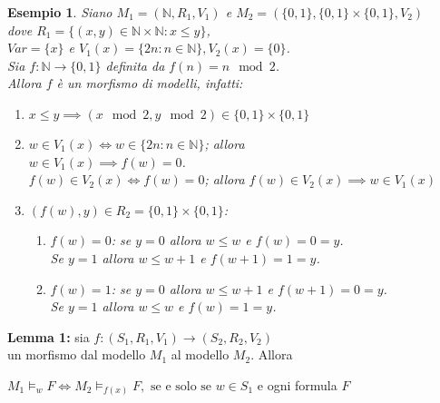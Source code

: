 \documentclass[a4paper,12pt]{article}
\theoremstyle{def}
\theoremstyle{prop}
\theoremstyle{esempio}
\newtheorem*{example}{Esempio}
\theoremstyle{dimostrazione}
\theoremstyle{teo}
\theoremstyle{osservazione}
\begin{document}
\begin{example}
	Siano \(M_1 = (\mathbb{N}, R_1, V_1)\) e \(M_2 = (\{0,1\}, \{0,1\} \times \{0,1\}, V_2)\)\\
	dove \(R_1 = \{(x,y) \in \mathbb{N} \times \mathbb{N} : x \leq y\}\),\\
	\(Var = \{x\}\) e \(V_1(x)= \{2n : n \in \mathbb{N}\}, V_2(x) = \{0\}\).\\
	Sia \(f: \mathbb{N} \rightarrow \{0,1\}\) definita da \(f(n) = n \mod 2\).\\
	Allora \(f\) è un morfismo di modelli, infatti:
	\begin{enumerate}
		\item \(x \leq y \implies (x \mod 2, y \mod 2) \in \{0,1\} \times \{0,1\}\)
		\item \(w \in V_1(x) \iff w \in \{2n: n \in \mathbb{N}\}\); allora\\
		      \(w \in V_1(x) \implies f(w) = 0\).\\
		      \(f(w) \in V_2(x) \iff f(w) = 0 \); allora \(f(w) \in V_2(x) \implies w \in V_1(x)\)
		\item \((f(w),y) \in R_2 = \{0,1\} \times \{0,1\}\):
		      \begin{enumerate}
			      \item \(f(w) = 0\): se \(y=0\) allora \(w \leq w\) e \(f(w) = 0 = y\).\\
			            Se \(y=1\) allora \(w \leq w+1\) e \(f(w+1) = 1 = y\).
			      \item \(f(w) = 1\): se \(y=0\) allora \(w \leq w + 1\) e \(f(w + 1) = 0 = y\).\\
			            Se \(y=1\) allora \(w \leq w\) e \(f(w) = 1 = y\).\\
		      \end{enumerate}
	\end{enumerate}
\end{example}
\newpage
\textbf{Lemma 1:} sia \(f: (S_1, R_1, V_1) \rightarrow (S_2, R_2, V_2)\)\\
un morfismo dal modello \(M_1\) al modello \(M_2\). Allora
\begin{center}
	\(M_1 \vDash_w F \iff M_2 \vDash_{f(x)} F, \text{ se e solo se } w \in S_1\) e ogni  formula \(F\)
\end{center}
\end{document}
